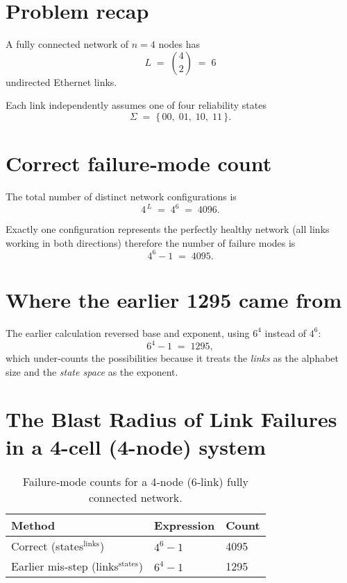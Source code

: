 \documentclass[../HFT-main.tex]{subfiles}
\begin{document}
%
%
%

\section{Problem recap}

A fully connected network of \(n = 4\) nodes has
\[
L \;=\;\binom{4}{2} \;=\; 6
\]
undirected Ethernet links.

Each link independently assumes one of four reliability states
\[
\Sigma \;=\; \{\,00,\;01,\;10,\;11\,\}.
\]

\section{Correct failure‑mode count}

The total number of distinct network configurations is
\[
4^{\,L} \;=\; 4^{6} \;=\; 4096.
\]

Exactly one configuration represents the perfectly healthy network (all links working in both directions)
therefore the number of failure modes is
\[
4^{6} - 1 \;=\; 4095.
\]

\section{Where the earlier 1295 came from}

The earlier calculation reversed base and exponent,
using \(6^{4}\) instead of \(4^{6}\):
\[
6^{4} - 1 \;=\; 1295,
\]
which under‑counts the possibilities because it treats the
\emph{links} as the alphabet size and the \emph{state space} as the exponent.

\section{The Blast Radius of Link Failures in a 4-cell (4-node) system}

\begin{table}[h]
\centering
\begin{tabular}{@{}lll@{}}
\toprule
Method & Expression & Count \\
\midrule
Correct (states\(^\text{links}\)) & \(4^{6} - 1\) & 4095 \\
Earlier mis‑step (links\(^\text{states}\)) & \(6^{4} - 1\) & 1295 \\
\bottomrule
\end{tabular}
\caption{Failure‑mode counts for a 4‑node (6‑link) fully connected network.}
\end{table}
\end{document}
